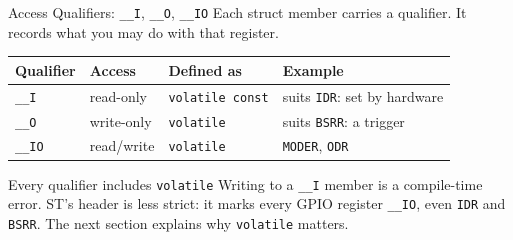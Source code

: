 \documentclass[9pt,aspectratio=169,xcolor=table]{beamer}
\begin{document}
\begin{frame}{Access Qualifiers: \texttt{\_\_I}, \texttt{\_\_O}, \texttt{\_\_IO}}
    \leavevmode
    Each struct member carries a qualifier. It records what you may do with that register.

    \vspace{2mm}
    \begin{center}
    {
    \striped
    \begin{tabular}{@{}l l l R{.3\textwidth}@{}}
        \toprule
        \textbf{Qualifier} & \textbf{Access} & \textbf{Defined as} & \textbf{Example} \\
        \midrule
        \texttt{\_\_I}  & read-only  & \texttt{volatile const} & suits \texttt{IDR}: set by hardware \\
        \texttt{\_\_O}  & write-only & \texttt{volatile}       & suits \texttt{BSRR}: a trigger \\
        \texttt{\_\_IO} & read/write & \texttt{volatile}       & \texttt{MODER}, \texttt{ODR} \\
        \bottomrule
    \end{tabular}}
    \end{center}

    \vspace{3mm}
    \begin{block}{Every qualifier includes \texttt{volatile}}
        Writing to a \texttt{\_\_I} member is a \alert{compile-time
        error}. ST's header is less strict: it marks every GPIO
        register \texttt{\_\_IO}, even \texttt{IDR} and \texttt{BSRR}.
        The next section explains why \texttt{volatile} matters.
    \end{block}
\end{frame}
\end{document}
